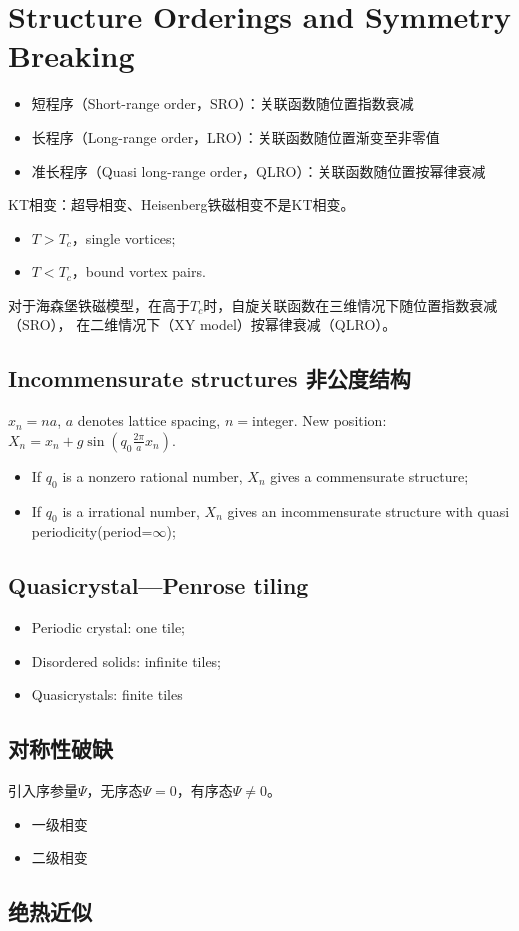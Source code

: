 \section{Structure Orderings and Symmetry Breaking}
\begin{itemize}
    \item 短程序（Short-range order，SRO）：关联函数随位置指数衰减
    \item 长程序（Long-range order，LRO）：关联函数随位置渐变至非零值
    \item 准长程序（Quasi long-range order，QLRO）：关联函数随位置按幂律衰减
\end{itemize}

KT相变：超导相变、Heisenberg铁磁相变不是KT相变。
\begin{itemize}
    \item $T>T_c$，single vortices;
    \item $T<T_c$，bound vortex pairs.
\end{itemize}

对于海森堡铁磁模型，在高于$T_c$时，自旋关联函数在三维情况下随位置指数衰减（SRO），
在二维情况下（XY model）按幂律衰减（QLRO）。

\subsection{Incommensurate structures 非公度结构}

$x_n=na$, $a$ denotes lattice spacing, $n=$integer. New position: $X_n=x_n+g\sin{(q_0\frac{2\pi}{a}x_n)}$.
\begin{itemize}
    \item If $q_0$ is a nonzero rational number, $X_n$ gives a commensurate structure;
    \item If $q_0$ is a irrational number, $X_n$ gives an incommensurate structure with quasi periodicity(period=$\infty$);
\end{itemize}

\subsection{Quasicrystal---Penrose tiling}

\begin{itemize}
    \item Periodic crystal: one tile;
    \item Disordered solids: infinite tiles;
    \item Quasicrystals: finite tiles
\end{itemize}

\subsection{对称性破缺}

引入序参量$\Psi$，无序态$\Psi=0$，有序态$\Psi\neq 0$。
\begin{itemize}
    \item 一级相变
    \item 二级相变
\end{itemize}

\subsection{绝热近似}